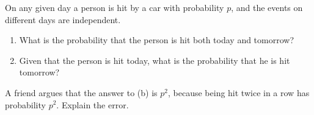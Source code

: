 On any given day a person is hit by a car with probability $p$, and the events on different days are independent.
\begin{enumerate}
\item[(a)] What is the probability that the person is hit both today and tomorrow?
\item[(b)] Given that the person is hit today, what is the probability that he is hit tomorrow?
\end{enumerate}
A friend argues that the answer to (b) is $p^2$, because being hit twice in a row has probability $p^2$. Explain the error.
